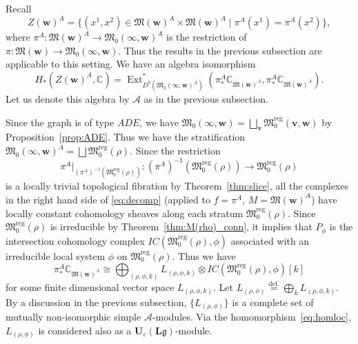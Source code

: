 \documentclass[12pt]{amsart}
\def\Bbb{\mathbb}
\def\frak{\mathfrak}
\theoremstyle{definition}
\theoremstyle{remark}
\numberwithin{equation}{subsection}
\newcommand{\thmref}[1]{Theorem~\ref{#1}}
\newcommand{\propref}[1]{Proposition~\ref{#1}}
\newcommand{\defeq}{\overset{\operatorname{\scriptstyle def.}}{=}}
\newcommand{\C}{{\Bbb C}}
\newcommand{\Ext}{\operatorname{Ext}}
\newcommand{\M}{{\frak M}} %
\newcommand{\Mreg}{{\frak M_0^{\operatorname{reg}}}}
\newcommand{\bv}{{\mathbf v}} %
\newcommand{\bw}{{\mathbf w}} %
\newcommand{\Ule}{{\mathbf U}_{\varepsilon}({\mathbf L}\mathfrak g)}
\newcommand{\Zw}{Z(\bw)}
\newcommand{\Mw}{\M(\bw)}
\newcommand{\ngpiso}{\overset{.}{=}}
\begin{document}
Recall
\begin{equation*}
   \Zw^A 
   = \{ (x^1, x^2)\in \Mw^A\times\Mw^A
   \mid \pi^A(x^1) = \pi^A(x^2) \},
\end{equation*}
where $\pi^A\colon\Mw^A\to \M_0(\infty,\bw)^A$ is the
restriction of $\pi\colon\Mw\to \M_0(\infty,\bw)$.
Thus the results in the previous subsection are applicable to this setting.
We have an algebra isomorphism
\begin{equation*}
   H_*(\Zw^A,\C) \ngpiso
   \Ext^*_{D^b(\M_0(\infty,\bw)^A)}
   (\pi^A_*\C_{\M(\bw)^A}, \pi^A_*\C_{\M(\bw)^A}).
\end{equation*}
Let us denote this algebra by $\mathcal A$ as in the previous
subsection.

Since the graph is of type $ADE$, we have
$\M_0(\infty,\bw) = \bigsqcup_\bv \Mreg(\bv,\bw)$ by \propref{prop:ADE}.
Thus we have the stratification
$\M_0(\infty,\bw)^A = \bigsqcup \Mreg(\rho)$.
Since the restriction
\[
    \pi^A|_{(\pi^A)^{-1}(\Mreg(\rho))}
\colon (\pi^A)^{-1}(\Mreg(\rho))\to
\Mreg(\rho)
\]
is a locally trivial topological fibration by \thmref{thm:slice},
%
all the complexes in the right hand side of \eqref{eq:decomp}
(applied to $f = \pi^A$, $M = \Mw^A$)
have locally constant cohomology sheaves along each stratum
$\Mreg(\rho)$. Since $\Mreg(\rho)$ is irreducible by
\thmref{thm:M(rho)_conn}, it implies that $P_\phi$ is the
intersection cohomology complex
\(
     IC(\Mreg(\rho),\phi)
\)
associated with an irreducible local system $\phi$ on
$\Mreg(\rho)$. Thus we have
\begin{equation}
\label{eq:DecompSecond}
   \pi^A_*\C_{\M(\bw)^A} \cong
   \bigoplus_{(\rho,\phi,k)} L_{(\rho,\phi,k)}\otimes 
   IC(\Mreg(\rho),\phi)[k]
\end{equation}
for some finite dimensional vector space $L_{(\rho,\phi,k)}$.
Let $L_{(\rho,\phi)} \defeq \bigoplus_k L_{(\rho,\phi,k)}$.
By a discussion in the previous subsection, $\{ L_{(\rho,\phi)} \}$ is 
a complete set of mutually non-isomorphic simple
\(
    \mathcal A
\)-modules. Via the homomorphism~\eqref{eq:homloc}, $L_{(\rho,\phi)}$
is considered also as a $\Ule$-module.
\end{document}
